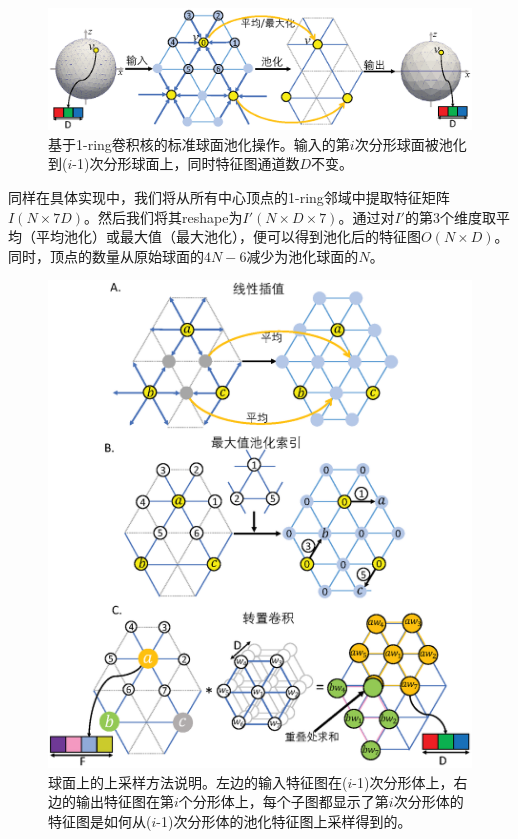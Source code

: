 \begin{figure}[h]
	\centering
	\includegraphics[width=\linewidth]{figure/figure_pooling_layer.eps}
	\caption{基于1-ring卷积核的标准球面池化操作。输入的第$i$次分形球面被池化到($i$-1)次分形球面上，同时特征图通道数$D$不变。}
	\label{fig:fig_std_pooling}
\end{figure}

同样在具体实现中，我们将从所有中心顶点的1-ring邻域中提取特征矩阵$I(N\times 7D)$。然后我们将其reshape为$I'(N\times D\times7)$。通过对$I'$的第3个维度取平均（平均池化）或最大值（最大池化），便可以得到池化后的特征图$O(N\times D)$。同时，顶点的数量从原始球面的$4N-6$减少为池化球面的$N$。

\begin{figure}[t]
	\centering
	\includegraphics[width=0.8\linewidth]{figure/figure_upsampling_layer.eps}
	\caption{球面上的上采样方法说明。左边的输入特征图在($i$-1)次分形体上，右边的输出特征图在第$i$个分形体上，每个子图都显示了第$i$次分形体的特征图是如何从($i$-1)次分形体的池化特征图上采样得到的。}
	\label{fig:fig_upsampling}
\end{figure}

